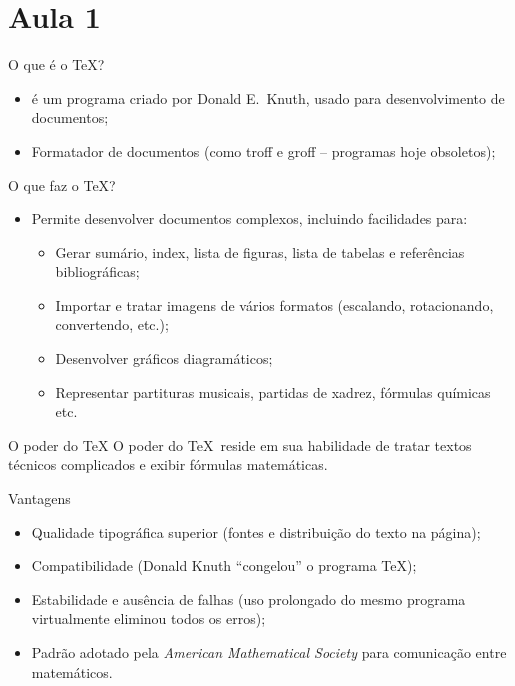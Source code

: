 \section{Aula 1}
\begin{frame}{O que é o \TeX?}
\begin{itemize}
\item \prog{\TeX} é um programa criado por Donald E.~Knuth, usado para desenvolvimento de documentos;
\item Formatador de documentos (como troff e groff -- programas hoje obsoletos);
\end{itemize}
\end{frame}

\begin{frame}{O que faz o \TeX?}
\begin{itemize}
\item Permite desenvolver documentos complexos, incluindo facilidades
  para:
  \begin{itemize}
\item Gerar sumário, index, lista de figuras, lista de 
  tabelas e referências bibliográficas;
\item Importar e tratar imagens de vários formatos  (escalando, rotacionando, convertendo, etc.);
\item Desenvolver gráficos diagramáticos;
\item Representar partituras musicais, partidas de xadrez, fórmulas químicas etc.
\end{itemize}
\end{itemize}

\begin{block}{O poder do \TeX}
O poder do \TeX\ reside em sua habilidade de tratar textos técnicos complicados e exibir fórmulas matemáticas.
\end{block}
\end{frame}

\begin{frame}{Vantagens}
\begin{itemize}
\item Qualidade tipográfica superior (fontes e distribuição do texto
  na página);
\item Compatibilidade (Donald Knuth ``congelou'' o
  programa \TeX);
\item Estabilidade e ausência de falhas (uso prolongado \newline do mesmo programa virtualmente
  eliminou todos os erros);
\item Padrão adotado pela \emph{American Mathematical \newline Society} para
  comunicação entre matemáticos.
\end{itemize}
\end{frame}

